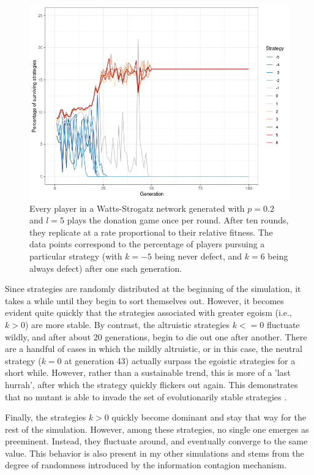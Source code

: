 \documentclass{JASSS}
\begin{document}
\begin{figure}
	\centering
	\includegraphics[width=\linewidth]{./figures/results_WS_N300_p02.png}
	\caption{Every player in a Watts-Strogatz network generated with $p=0.2$ and $l=5$ plays the donation game once per round. After ten rounds, they replicate at a rate proportional to their relative fitness. The data points correspond to the percentage of players pursuing a particular strategy (with $k=-5$ being never defect, and $k=6$ being always defect) after one such generation.}
	\label{WS_300_p_03}
\end{figure}

Since strategies are randomly distributed at the beginning of the simulation, it takes a while until they begin to sort themselves out. However, it becomes evident quite quickly that the strategies associated with greater egoism (i.e., $k>0$) are more stable. By contrast, the altruistic strategies $k<=0$ fluctuate wildly, and after about 20 generations, begin to die out one after another. There are a handful of cases in which the mildly altruistic, or in this case, the neutral strategy ($k=0$ at generation 43) actually surpass the egoistic strategies for a short while. However, rather than a sustainable trend, this is more of a 'last hurrah', after which the strategy quickly flickers out again. This demonstrates that no mutant is able to invade the set of evolutionarily stable strategies \citep{hamilton1964_2}.

Finally, the strategies $k>0$ quickly become dominant and stay that way for the rest of the simulation. However, among these strategies, no single one emerges as preeminent. Instead, they fluctuate around, and eventually converge to the same value. This behavior is also present in my other simulations and stems from the degree of randomness introduced by the information contagion mechanism.
\end{document}
